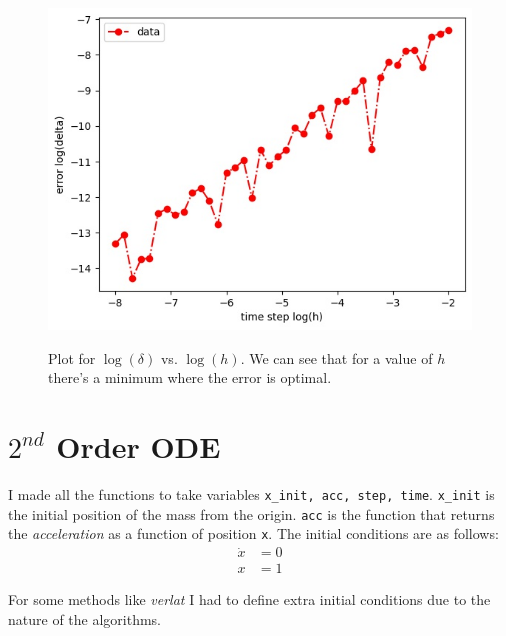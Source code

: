 \documentclass[12pt, a4paper]{article}
\begin{document}
	\begin{figure}[h!]
		\centering
		\includegraphics[width=0.8\linewidth]{../p1/error.jpg}
		\label{fig:error}
		\caption{Plot for \emph{$\log(\delta)$} vs. \emph{$\log(h)$}. We can see that for a value of $h$ there's a minimum where the error is optimal.}
	\end{figure}

	\section{$2^{nd}$ Order ODE}
	I made all the functions to take variables \texttt{x\_init, acc, step, time}. \texttt{x\_init} is the initial position of the mass from the origin.
	\texttt{acc} is the function that returns the \emph{acceleration} as a function of position \texttt{x}.
	The initial conditions are as follows:
	\begin{equation}
		\begin{aligned}
			\dot{x} &= 0\\
			x & = 1
		\end{aligned}
	\end{equation}
	
	For some methods like \emph{verlat} I had to define extra initial conditions due to the nature of the algorithms.
	
\end{document}
